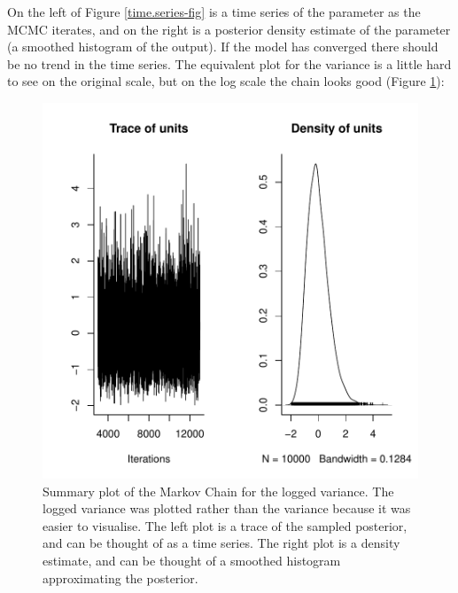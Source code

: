 \documentclass{article}
\begin{document}
On the left of Figure \ref{time.series-fig} is a time series of the parameter as the MCMC iterates, and on the right is a posterior density estimate of the parameter (a smoothed histogram of the output). If the model has converged there should be no trend in the time series. The equivalent plot for the variance is a little hard to see on the original scale, but on the log scale the chain looks good (Figure \ref{time.series2-fig}):


\begin{Schunk}
\end{Schunk}

\begin{figure}[!h]
\begin{center}
\includegraphics{Lecture1-060}
\end{center}
\caption{Summary plot of the Markov Chain for the logged variance. The logged variance was plotted rather than the variance because it was easier to visualise. The left plot is a trace of the sampled posterior, and can be thought of as a time series.  The right plot is a density estimate, and can be thought of a smoothed histogram approximating the posterior.}
\label{time.series2-fig}
\end{figure}
\end{document}
